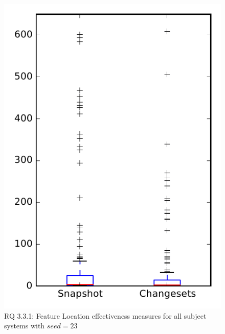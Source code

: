 
\begin{figure}
\centering
\includegraphics[height=0.4\textheight]{figures/flt_seed/rq1_overview_23}
\caption{RQ 3.3.1: Feature Location effectiveness measures for all subject systems with $seed=23$}
\label{fig:flt_seed:rq1:overview}
\end{figure}
